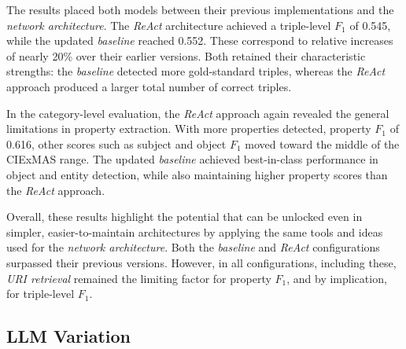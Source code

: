 \documentclass[a4paper,oneside,bibliography=totoc]{scrbook}
\begin{document}
The results placed both models between their previous implementations and the \textit{network architecture}. The \textit{ReAct} architecture achieved a triple-level $F_{1}$ of 0.545, while the updated \textit{baseline} reached 0.552. These correspond to relative increases of nearly 20\% over their earlier versions. Both retained their characteristic strengths: the \textit{baseline} detected more gold-standard triples, whereas the \textit{ReAct} approach produced a larger total number of correct triples.

In the category-level evaluation, the \textit{ReAct} approach again revealed the general limitations in property extraction. With more properties detected, property $F_{1}$ of 0.616, other scores such as subject and object $F_{1}$ moved toward the middle of the CIExMAS range. The updated \textit{baseline} achieved best-in-class performance in object and entity detection, while also maintaining higher property scores than the \textit{ReAct} approach.

Overall, these results highlight the potential that can be unlocked even in simpler, easier-to-maintain architectures by applying the same tools and ideas used for the \textit{network architecture}. Both the \textit{baseline} and \textit{ReAct} configurations surpassed their previous versions. However, in all configurations, including these, \textit{\ac{URI} retrieval} remained the limiting factor for property $F_{1}$, and by implication, for triple-level $F_{1}$.


\subsection{LLM Variation}
\label{subsec:llm_model_variation}
\end{document}
